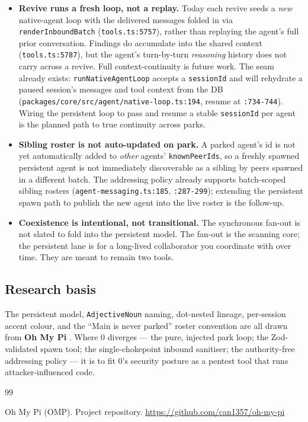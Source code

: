 \documentclass[11pt]{article}
\begin{document}
\begin{itemize}[leftmargin=*]
  \item \textbf{Revive runs a fresh loop, not a replay.} Today each revive seeds a
  \textit{new} native-agent loop with the delivered messages folded in via
  \texttt{renderInboundBatch} (\texttt{tools.ts:5757}), rather than replaying the
  agent's full prior conversation. Findings do accumulate into the shared context
  (\texttt{tools.ts:5787}), but the agent's turn-by-turn \textit{reasoning} history
  does not carry across a revive. Full context-continuity is future work. The seam
  already exists: \texttt{runNativeAgentLoop} accepts a \texttt{sessionId} and will
  rehydrate a paused session's messages and tool context from the DB
  (\texttt{packages/core/src/agent/native-loop.ts:194}, resume at \texttt{:734-744}).
  Wiring the persistent loop to pass and resume a stable \texttt{sessionId} per
  agent is the planned path to true continuity across parks.
  \item \textbf{Sibling roster is not auto-updated on park.} A parked agent's id is
  not yet automatically added to \textit{other} agents' \texttt{knownPeerIds}, so a
  freshly spawned persistent agent is not immediately discoverable as a sibling by
  peers spawned in a different batch. The addressing policy already supports
  batch-scoped sibling rosters (\texttt{agent-messaging.ts:185}, \texttt{:287-299});
  extending the persistent spawn path to publish the new agent into the live roster
  is the follow-up.
  \item \textbf{Coexistence is intentional, not transitional.} The synchronous
  fan-out is not slated to fold into the persistent model. The fan-out is the
  scanning core; the persistent lane is for a long-lived collaborator you
  coordinate with over time. They are meant to remain two tools.
\end{itemize}

\subsection{Research basis}

The persistent model, \texttt{AdjectiveNoun} naming, dot-nested lineage,
per-session accent colour, and the ``Main is never parked'' roster convention are
all drawn from \textbf{Oh My Pi} \citep{omp}. Where 0 diverges --- the pure,
injected park loop; the Zod-validated spawn tool; the single-chokepoint inbound
sanitiser; the authority-free addressing policy --- it is to fit 0's security
posture as a pentest tool that runs attacker-influenced code.

\begin{thebibliography}{99}

Oh My Pi (OMP). Project repository.
\url{https://github.com/can1357/oh-my-pi}

\end{thebibliography}
\end{document}
